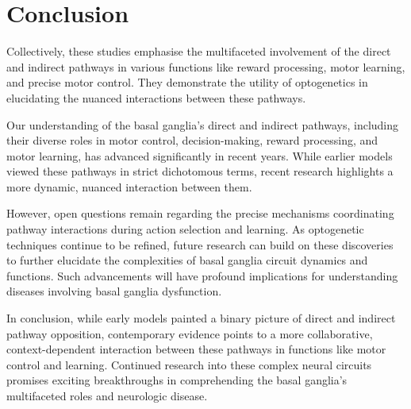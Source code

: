 \documentclass[10pt]{article}
\begin{document}
\begin{sloppypar}
  \section{Conclusion}
  \label{sec:conclusion}

  Collectively, these studies emphasise the multifaceted involvement of the direct and indirect pathways in various functions like reward processing, motor learning, and precise motor control. They demonstrate the utility of optogenetics in elucidating the nuanced interactions between these pathways.

  Our understanding of the basal ganglia’s direct and indirect pathways, including their diverse roles in motor control, decision-making, reward processing, and motor learning, has advanced significantly in recent years. While earlier models viewed these pathways in strict dichotomous terms, recent research highlights a more dynamic, nuanced interaction between them.

  However, open questions remain regarding the precise mechanisms coordinating pathway interactions during action selection and learning. As optogenetic techniques continue to be refined, future research can build on these discoveries to further elucidate the complexities of basal ganglia circuit dynamics and functions. Such advancements will have profound implications for understanding diseases involving basal ganglia dysfunction.

  In conclusion, while early models painted a binary picture of direct and indirect pathway opposition, contemporary evidence points to a more collaborative, context-dependent interaction between these pathways in functions like motor control and learning. Continued research into these complex neural circuits promises exciting breakthroughs in comprehending the basal ganglia’s multifaceted roles and neurologic disease.

  \pagebreak
  \singlespacing %
  
  

\end{sloppypar}
\end{document}
